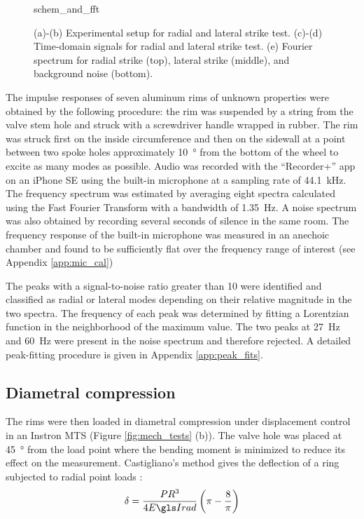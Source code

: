 \documentclass[../thesis.tex]{subfiles}
\begin{document}
\begin{figure}
\centering
{schem_and_fft}
\caption{(a)-(b) Experimental setup for radial and lateral strike test. (c)-(d) Time-domain signals for radial and lateral strike test. (e) Fourier spectrum for radial strike (top), lateral strike (middle), and background noise (bottom).}
\label{fig:schem}
\end{figure}

The impulse responses of seven aluminum rims of unknown properties were obtained by the following procedure: the rim was suspended by a string from the valve stem hole and struck with a screwdriver handle wrapped in rubber. The rim was struck first on the inside circumference and then on the sidewall at a point between two spoke holes approximately \SI{10}{\degree} from the bottom of the wheel to excite as many modes as possible. Audio was recorded with the ``Recorder+'' app on an iPhone SE using the built-in microphone at a sampling rate of \SI{44.1}{kHz}. The frequency spectrum was estimated by averaging eight spectra calculated using the Fast Fourier Transform with a bandwidth of \SI{1.35}{Hz}. A noise spectrum was also obtained by recording several seconds of silence in the same room. The frequency response of the built-in microphone was measured in an anechoic chamber and found to be sufficiently flat over the frequency range of interest (see Appendix \ref{app:mic_cal})

The peaks with a signal-to-noise ratio greater than 10 were identified and classified as radial or lateral modes depending on their relative magnitude in the two spectra. The frequency of each peak was determined by fitting a Lorentzian function in the neighborhood of the maximum value. The two peaks at \SI{27}{Hz} and \SI{60}{Hz} were present in the noise spectrum and therefore rejected. A detailed peak-fitting procedure is given in Appendix \ref{app:peak_fits}.

\subsection{Diametral compression}
The rims were then loaded in diametral compression under displacement control in an Instron MTS (Figure \ref{fig:mech_tests} (b)). The valve hole was placed at \SI{45}{\degree} from the load point where the bending moment is minimized to reduce its effect on the measurement. Castigliano's method gives the deflection of a ring subjected to radial point loads \cite{Timoshenko1961}:
  \begin{equation}\label{eq:def_rad}
  \delta = \frac{PR^3}{4\EIr} \left(\pi-\frac{8}{\pi} \right)
  \end{equation}
\end{document}
